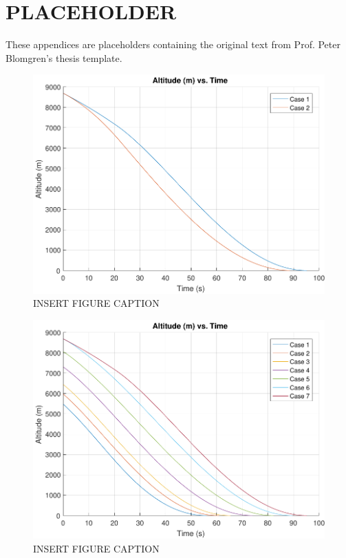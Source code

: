 \appendices
%
%

\chapter{PLACEHOLDER}

These appendices are placeholders containing the original text from Prof. Peter Blomgren's thesis template.

\begin{figure}[H]
	\centering
	\begin{minipage}{4.5 in}
		\includegraphics[width=\linewidth]{Figures/altatmovsvac.pdf}
		\caption{INSERT FIGURE CAPTION \label{fig:altatmovsvac} }
	\end{minipage}
\end{figure}



\begin{figure}[H]
	\centering
	\begin{minipage}{4.5 in}
		\includegraphics[width=\linewidth]{Figures/altpowatmo.pdf}
		\caption{INSERT FIGURE CAPTION \label{fig:altpowatmo} }
	\end{minipage}
\end{figure}




